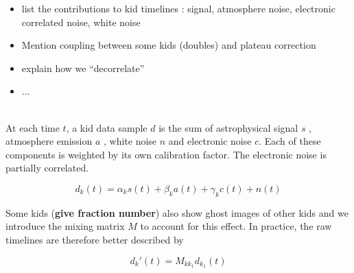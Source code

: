 
\begin{itemize}
\item list the contributions to kid timelines : signal, atmosphere noise,
  electronic correlated noise, white noise
\item Mention coupling between some kids (doubles) and plateau correction
\item explain how we ``decorrelate''
\item ...
\end{itemize}
~\\

At each time $t$, a kid data sample $d$ is the sum of astrophysical signal $s$ ,
atmosphere emission $a$ , white noise $n$ and electronic noise $c$. Each of
these components is weighted by its own calibration factor. The electronic noise
is partially correlated.

\begin{equation}
d_k(t) = \alpha_k s(t) + \beta_k a(t) + \gamma_k c(t) + n(t)
\end{equation}

Some kids ({\bf give fraction number}) also show ghost images of other kids and
we introduce the mixing matrix $M$ to account for this effect. In practice, the
raw timelines are therefore better described by

\begin{equation}
d_k'(t) = M_{kk_1}d_{k_1}(t)
\end{equation}

